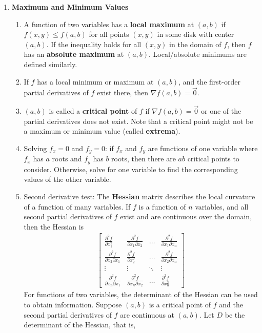 \documentclass[10pt]{article}
\begin{document}
\begin{multicols}{2}
\begin{enumerate}
    \item \textbf{Maximum and Minimum Values}
    \begin{enumerate}
        \item A function of two variables has a \textbf{local maximum} at $(a,b)$ if $f(x,y) \leq f(a,b)$ for all points $(x,y)$ in some disk with center $(a,b)$. If the inequality holds for all $(x,y)$ in the domain of $f$, then $f$ has an \textbf{absolute maximum} at $(a,b)$. Local/absolute minimums are defined similarly.
        \item If $f$ has a local minimum or maximum at $(a,b)$, and the first-order partial derivatives of $f$ exist there, then $\nabla f(a,b) = \vec{0}$.
        \item $(a,b)$ is called a \textbf{critical point} of $f$ if $\nabla f(a,b) = \vec{0}$ or one of the partial derivatives does not exist. Note that a critical point might not be a maximum or minimum value (called \textbf{extrema}).
        \item Solving $f_x = 0$ and $f_y = 0$: if $f_x$ and $f_y $ are functions of one variable where $f_x$ has $a$ roots and $f_y$ has $b$ roots, then there are $ab$ critical points to consider. Otherwise, solve for one variable to find the corresponding values of the other variable.
        \item Second derivative test: The \textbf{Hessian} matrix describes the local curvature of a function of many variables. If $f$ is a function of $n$ variables, and all second partial derivatives of $f$ exist and are continuous over the domain, then the Hessian is
        \begin{align*}
            \begin{bmatrix} 
            \frac{\partial^2 f}{\partial x_1^2} & \frac{\partial^2 f}{\partial x_1 \partial x_2} & \hdots & \frac{\partial^2 f}{\partial x_1 \partial x_n} \\[8 pt]
            \frac{\partial^2 f}{\partial x_2\partial x_1} & \frac{\partial^2 f}{\partial x^2_2} & \hdots & \frac{\partial^2 f}{\partial x_2 \partial x_n} \\[4 pt] 
            \vdots & \vdots & \ddots & \vdots \\[4 pt]
            \frac{\partial^2 f}{\partial x_n\partial x_1} & \frac{\partial^2 f}{\partial x_n \partial x_2} & \hdots & \frac{\partial^2 f}{\partial x^2_n}
            \end{bmatrix}
        \end{align*}
        For functions of two variables, the determinant of the Hessian can be used to obtain information. Suppose $(a,b)$ is a critical point of $f$ and the second partial derivatives of $f$ are continuous at $(a,b)$. Let $D$ be the determinant of the Hessian, that is,

\end{enumerate}
\end{enumerate}
\end{multicols}
\end{document}
